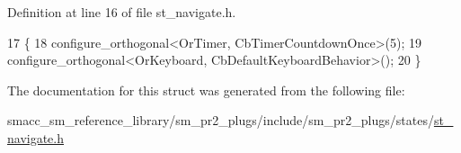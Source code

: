 Definition at line 16 of file st\+\_\+navigate.\+h.


\begin{DoxyCode}
17     \{
18         configure\_orthogonal<OrTimer,  CbTimerCountdownOnce>(5);    
19         configure\_orthogonal<OrKeyboard, CbDefaultKeyboardBehavior>();
20     \}
\end{DoxyCode}


The documentation for this struct was generated from the following file\+:\begin{DoxyCompactItemize}
\item 
smacc\+\_\+sm\+\_\+reference\+\_\+library/sm\+\_\+pr2\+\_\+plugs/include/sm\+\_\+pr2\+\_\+plugs/states/\hyperlink{st__navigate_8h}{st\+\_\+navigate.\+h}\end{DoxyCompactItemize}
